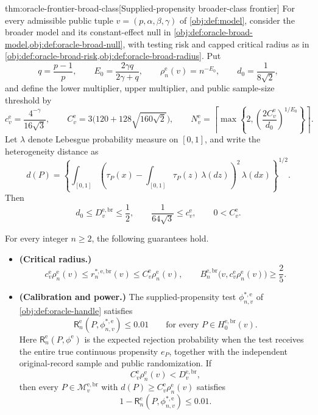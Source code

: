 \documentclass[11pt]{article}
\begin{document}
\begin{theoremv}{thm:oracle-frontier-broad-class}[Supplied-propensity broader-class frontier]
For every admissible public tuple \(v=(p,\alpha,\beta,\gamma)\) of \cref{obj:def:model}, consider the broader model and its constant-effect null in \cref{obj:def:oracle-broad-model,obj:def:oracle-broad-null}, with testing risk and capped critical radius as in \cref{obj:def:oracle-broad-risk,obj:def:oracle-broad-radius}. Put
\[
q=\frac{p-1}{p},\qquad
E_0=\frac{2\gamma q}{2\gamma+q},\qquad
\rho_n^{\mathrm e}(v)=n^{-E_0},\qquad
d_0=\frac{1}{8\sqrt2},
\]
and define the lower multiplier, upper multiplier, and public sample-size threshold by
\[
c_v^{\mathrm e}=\frac{4^{-\gamma}}{16\sqrt3},\qquad
C_v^{\mathrm e}=3\bigl(120+128\sqrt{160\sqrt2}\bigr),\qquad
N_v^{\mathrm e}
=\left\lceil\max\left\{2,
\left(\frac{2C_v^{\mathrm e}}{d_0}\right)^{1/E_0}
\right\}\right\rceil .
\]
Let \(\lambda\) denote Lebesgue probability measure on \([0,1]\), and write the heterogeneity distance as
\[
d(P)=
\left\{\int_{[0,1]}
\left(\tau_P(x)-\int_{[0,1]}\tau_P(z)\,\lambda(dz)\right)^2
\,\lambda(dx)\right\}^{1/2}.
\]
Then
\[
d_0\le D_v^{\mathrm{e,br}}\le\frac12,\qquad
\frac{1}{64\sqrt3}\le c_v^{\mathrm e},\qquad
0<C_v^{\mathrm e}.
\]

For every integer \(n\ge2\), the following guarantees hold.
\begin{itemize}
\item \textbf{(Critical radius.)}
\[
c_v^{\mathrm e}\rho_n^{\mathrm e}(v)
\le r_n^{*,\mathrm{e,br}}(v)
\le C_v^{\mathrm e}\rho_n^{\mathrm e}(v),
\qquad
B_n^{\mathrm{e,br}}
\bigl(v,c_v^{\mathrm e}\rho_n^{\mathrm e}(v)\bigr)
\ge\frac25.
\]

\item \textbf{(Calibration and power.)}
The supplied-propensity test \(\phi^{*,\mathrm e}_{n,v}\) of
\cref{obj:def:oracle-handle} satisfies
\[
\mathsf R_n^{\mathrm e}
(P,\phi^{*,\mathrm e}_{n,v})\le0.01
\qquad
\text{for every }P\in H_0^{\mathrm{e,br}}(v).
\]
Here \(\mathsf R_n^{\mathrm e}(P,\phi^{\mathrm e})\) is the expected rejection probability when the test receives the entire true continuous propensity \(e_P\), together with the independent original-record sample and public randomization. If
\[
C_v^{\mathrm e}\rho_n^{\mathrm e}(v)<D_v^{\mathrm{e,br}},
\]
then every \(P\in\mathcal M_v^{\mathrm{e,br}}\) with
\(d(P)\ge C_v^{\mathrm e}\rho_n^{\mathrm e}(v)\) satisfies
\[
1-\mathsf R_n^{\mathrm e}
(P,\phi^{*,\mathrm e}_{n,v})\le0.01.
\]


\end{itemize}
\end{theoremv}
\end{document}
